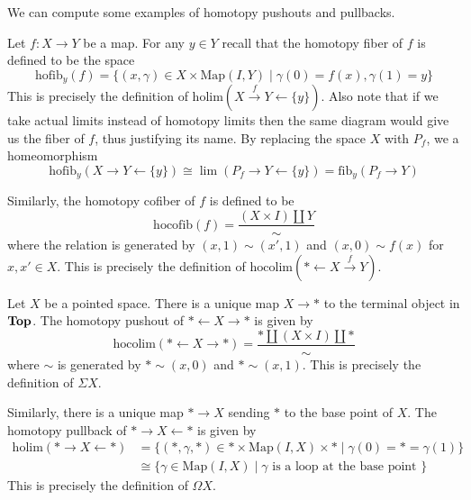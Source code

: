 We can compute some examples of homotopy pushouts and pullbacks. 

\begin{eg}\label{eg:Hofib} Let $f:X\to Y$ be a map. For any $y\in Y$ recall that the homotopy fiber of $f$ is defined to be the space $$\text{hofib}_y(f)=\{(x,\gamma)\in X\times\text{Map}(I,Y)\;|\;\gamma(0)=f(x),\gamma(1)=y\}$$ This is precisely the definition of $\text{holim}(X\overset{f}{\rightarrow}Y\leftarrow\{y\})$. Also note that if we take actual limits instead of homotopy limits then the same diagram would give us the fiber of $f$, thus justifying its name. By replacing the space $X$ with $P_f$, we a homeomorphism $$\text{hofib}_{y}(X\rightarrow Y\leftarrow\{y\})\cong\lim(P_f\rightarrow Y\leftarrow\{y\})=\text{fib}_{y}(P_f\rightarrow Y)$$ 

Similarly, the homotopy cofiber of $f$ is defined to be $$\text{hocofib}(f)=\frac{(X\times I)\amalg Y}{\sim}$$ where the relation is generated by $(x,1)\sim(x',1)$ and $(x,0)\sim f(x)$ for $x,x'\in X$. This is precisely the definition of $\text{hocolim}(\ast\leftarrow X\overset{f}{\rightarrow}Y)$. 
\end{eg}

\begin{eg}\label{eg:SusLoop} Let $X$ be a pointed space. There is a unique map $X\to\ast$ to the terminal object in $\bold{Top}$. The homotopy pushout of $\ast\leftarrow X\rightarrow\ast$ is given by $$\text{hocolim}(\ast\leftarrow X\rightarrow\ast)=\frac{\ast\amalg(X\times I)\amalg\ast}{\sim}$$ where $\sim$ is generated by $\ast\sim(x,0)$ and $\ast\sim(x,1)$. This is precisely the definition of $\Sigma X$. 

Similarly, there is a unique map $\ast\to X$ sending $\ast$ to the base point of $X$. The homotopy pullback of $\ast\rightarrow X\leftarrow\ast$ is given by 
\begin{align*}
\text{holim}(\ast\rightarrow X\leftarrow\ast)&=\{(\ast,\gamma,\ast)\in\ast\times\text{Map}(I,X)\times\ast\;|\;\gamma(0)=\ast=\gamma(1)\}\\
&\cong\{\gamma\in\text{Map}(I,X)\;|\;\gamma\text{ is a loop at the base point }\}
\end{align*}
This is precisely the definition of $\Omega X$. 
\end{eg}

